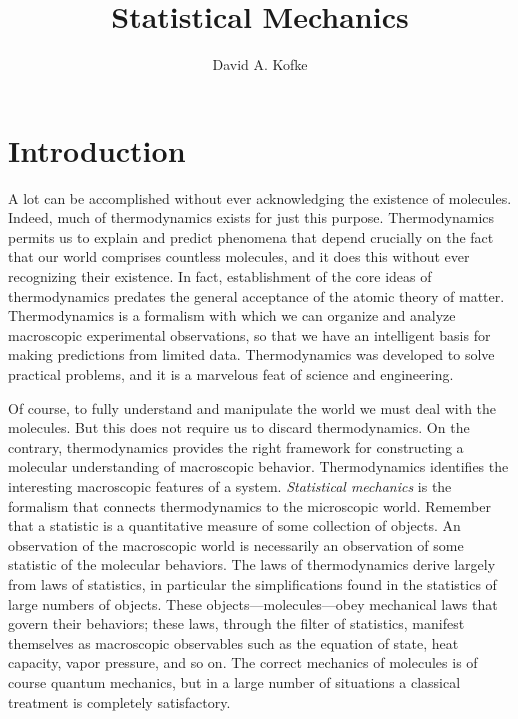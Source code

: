 \documentclass[9pt,bestpractices]{molsim}
\title{Statistical Mechanics}
\author[1*]{David A. Kofke}
\affil[1]{University at Buffalo}
\begin{document}
\maketitle

\section{Introduction}
\label{statistical-mechanics}

A lot can be accomplished without ever acknowledging the existence of
molecules. Indeed, much of thermodynamics exists for just this purpose.
Thermodynamics permits us to explain and predict phenomena that depend
crucially on the fact that our world comprises countless molecules, and
it does this without ever recognizing their existence. In fact,
establishment of the core ideas of thermodynamics predates the general
acceptance of the atomic theory of matter. Thermodynamics is a formalism
with which we can organize and analyze macroscopic experimental
observations, so that we have an intelligent basis for making
predictions from limited data. Thermodynamics was developed to solve
practical problems, and it is a marvelous feat of science and
engineering.

Of course, to fully understand and manipulate the world we must deal
with the molecules. But this does not require us to discard
thermodynamics. On the contrary, thermodynamics provides the right
framework for constructing a molecular understanding of macroscopic
behavior. Thermodynamics identifies the interesting macroscopic features
of a system. \emph{Statistical mechanics} is the formalism that connects
thermodynamics to the microscopic world. Remember that a statistic is a
quantitative measure of some collection of objects. An observation of
the macroscopic world is necessarily an observation of some statistic of
the molecular behaviors. The laws of thermodynamics derive largely from
laws of statistics, in particular the simplifications found in the
statistics of large numbers of objects. These objects---molecules---obey
mechanical laws that govern their behaviors; these laws, through the
filter of statistics, manifest themselves as macroscopic observables
such as the equation of state, heat capacity, vapor pressure, and so on.
The correct mechanics of molecules is of course quantum mechanics, but
in a large number of situations a classical treatment is completely
satisfactory.
\end{document}
